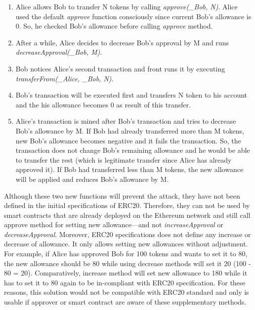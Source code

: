 \begin{enumerate}
	\item Alice allows Bob to transfer N tokens by calling \textit{approve(\_Bob, N)}. Alice used the default \textit{approve} function consciously since current Bob’s allowance is 0. So, he checked Bob's allowance before calling \textit{approve} method.
	\item After a while, Alice decides to decrease Bob’s approval by M and runs \textit{decreaseApproval(\_Bob, M)}.
	\item Bob notices Alice’s second transaction and front runs it by executing \textit{transferFrom(\_Alice, \_Bob, N)}.
	\item Bob’s transaction will be executed first and transfers N token to his account and the his allowance becomes 0 as result of this transfer.
	\item Alice’s transaction is mined after Bob’s transaction and tries to decrease Bob’s allowance by M. If Bob had already transferred more than M tokens, new Bob’s allowance becomes negative and it fails the transaction. So, the transaction does not change Bob’s remaining allowance and he would be able to transfer the rest (which is legitimate transfer since Alice has already approved it). If Bob had transferred less than M tokens, the new allowance will be applied and reduces Bob’s allowance by M.\newline
\end{enumerate}
\noindent Although these two new functions will prevent the attack, they have not been defined in the initial specifications of ERC20. Therefore, they can not be used by smart contracts that are already deployed on the Ethereum network and still call approve method for setting new allowance---and not \textit{increaseApproval} or \textit{decreaseApproval}. Moreover, ERC20 specifications does not define any increase or decrease of allowance. It only allows setting new allowances without adjustment. For example, if Alice has approved Bob for 100 tokens and wants to set it to 80, the new allowance should be 80 while using decrease methods will set it 20 (100 - 80 = 20). Comparatively, increase method will set new allowance to 180 while it has to set it to 80 again to be in-compliant with ERC20 specification. For these reasons, this solution would not be compatible with ERC20 standard and only is usable if approver or smart contract are aware of these supplementary methods.


